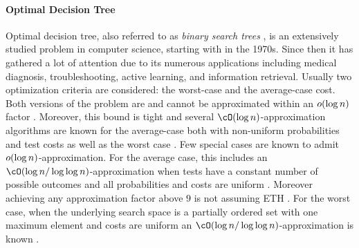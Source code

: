 \paragraph{Optimal Decision Tree}
Optimal decision tree, also referred to as \emph{binary search trees} \cite{BoseCIKL20,DemaineHIP07}, is an extensively studied problem in computer science, starting with \cite{GareyPerfBoundsOnSplittingAlgForBinTesting} in the 1970s.
Since then it has gathered a lot of attention due to its numerous applications including medical diagnosis, troubleshooting, active learning, and information retrieval.
Usually two optimization criteria are considered: the worst-case and the average-case cost.
Both versions of the problem are \NPhard and cannot be approximated within an $o\mathopen{}\left( \log n \right)$ factor \cite{ConstructOptimalBinaryDecisionTreesIsNPComplete,HardnessOfMinHeightDTP,ApproximatingDecisionTreesMultiwayBranches,DiagnosisDetermination}.
Moreover, this bound is tight and several $\cO(\log n)$-approximation algorithms are known for the average-case both with non-uniform probabilities and test costs \cite{OptimalSplitTreeProblem,AnalysisGreedyActiveLearning,ApproximatingDecisionTreesMultiwayBranches,AverageCaseActiveLearningWithCosts,ApproximatingOptimalBinaryDecisionTrees,DTsforEntIdent,ApproxAlgsForOptDTsAndAdapTSPProblems,DiagnosisDetermination,AdaptiveSubmodularRankingAndRouting,AdaptivityInAdaptiveSubmodularity,MinimumCostAdaptiveSubmodularCover} as well as the worst case \cite{DecisionTreesForGeometricModels,TheCostComplexityOfInteractiveLearning,DiagnosisDetermination}. Few special cases are known to admit $o\mathopen{}\left( \log n \right)$-approximation. For the average case, this includes an $\cO\br{\log n/\log \log n}$-approximation when tests have a constant number of possible outcomes and all probabilities and costs are uniform \cite{TightAnalysisGreedyUniformDecisionTree}.
Moreover achieving any approximation factor above $9$ is not \NPhard assuming ETH \cite{TightAnalysisGreedyUniformDecisionTree}.
For the worst case, when the underlying search space is a partially ordered set with one maximum element and costs are uniform an $\cO\br{\log n/\log \log n}$-approximation is known \cite{EdgeRankingSearchingPartialOrders}.


